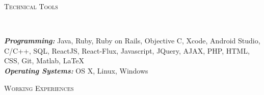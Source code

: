 \documentclass[11pt]{article}
\newenvironment{changemargin}[2]{%
  \begin{list}{}{%
    \setlength{\topsep}{0pt}%
    \setlength{\leftmargin}{#1}%
    \setlength{\rightmargin}{#2}%
    \setlength{\listparindent}{\parindent}%
    \setlength{\itemindent}{\parindent}%
    \setlength{\parsep}{\parskip}%
  }%
  \item[]}{\end{list}
}
\newcommand{\lineover}{
	\begin{changemargin}{-0.05in}{-0.05in}
		\vspace*{-8pt}
		\hrulefill \\
		\vspace*{-2pt}
	\end{changemargin}
}
\newcommand{\header}[1]{
	\begin{changemargin}{-0.5in}{-0.5in}
		\scshape{#1}\\
  	\lineover
	\end{changemargin}
}
\newenvironment{body} {
	\vspace*{-16pt}
	\begin{changemargin}{-0.25in}{-0.5in}
  }	
	{\end{changemargin}
}
\begin{document}
\header{Technical Tools}
\begin{body}
	\vspace{14pt}
	\emph{\textbf{Programming:}}{} Java, Ruby, Ruby on Rails, Objective C, Xcode, Android Studio, C/C++, SQL, ReactJS, React-Flux, Javascript, JQuery, AJAX, PHP, HTML, CSS, Git, Matlab, \LaTeX\\
\medskip
	\emph{\textbf{Operating Systems:}}{} OS X, Linux, Windows\\
\end{body}
\smallskip
\header{Working Experiences}
\end{document}
